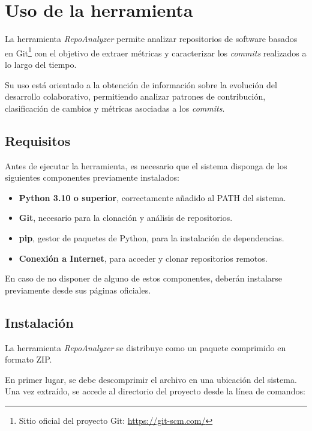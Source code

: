 \documentclass[a4paper, 12pt]{book}
\begin{document}
\section{Uso de la herramienta}
\label{sec:uso_herramienta}

La herramienta \emph{RepoAnalyzer} permite analizar repositorios de software basados en Git\footnote{Sitio oficial del proyecto Git: \url{https://git-scm.com/}} con el objetivo de extraer métricas y caracterizar los \emph{commits} realizados a lo largo del tiempo.

Su uso está orientado a la obtención de información sobre la evolución del desarrollo colaborativo, permitiendo analizar patrones de contribución, clasificación de cambios y métricas asociadas a los \emph{commits}.

\subsection{Requisitos}
\label{subsec:requisitos}

Antes de ejecutar la herramienta, es necesario que el sistema disponga de los siguientes componentes previamente instalados:

\begin{itemize}
    \item \textbf{Python 3.10 o superior}, correctamente añadido al PATH del sistema.
    
    \item \textbf{Git}, necesario para la clonación y análisis de repositorios.
    
    \item \textbf{pip}, gestor de paquetes de Python, para la instalación de dependencias.
    
    \item \textbf{Conexión a Internet}, para acceder y clonar repositorios remotos.
\end{itemize}

En caso de no disponer de alguno de estos componentes, deberán instalarse previamente desde sus páginas oficiales.

\subsection{Instalación}
\label{subsec:instalacion}

La herramienta \emph{RepoAnalyzer} se distribuye como un paquete comprimido en formato ZIP.

En primer lugar, se debe descomprimir el archivo en una ubicación del sistema. Una vez extraído, se accede al directorio del proyecto desde la línea de comandos:
\end{document}
